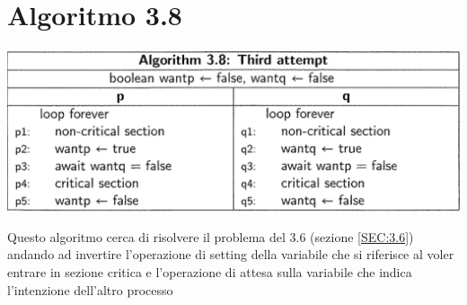 \documentclass[a4paper]{article}
\begin{document}
\section{Algoritmo 3.8}
\label{SEC:3.8}
\begin{center}\includegraphics[width=1\textwidth]{3.8.png}\end{center}
Questo algoritmo cerca di risolvere il problema del 3.6 (sezione \ref{SEC:3.6}) andando ad invertire l'operazione di setting della variabile che si riferisce al voler entrare in sezione critica e l'operazione di attesa sulla variabile che indica l'intenzione dell'altro processo
\end{document}
